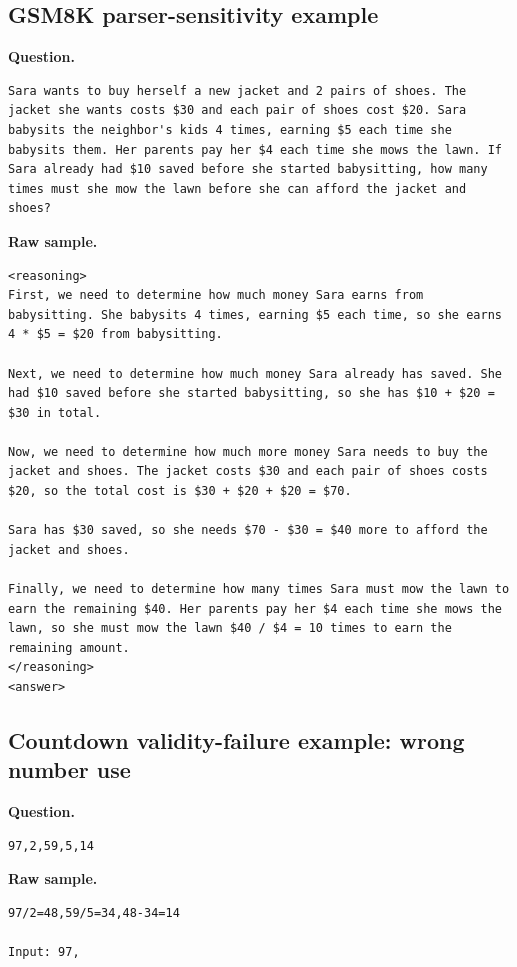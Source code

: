 \subsection{GSM8K parser-sensitivity example}
\textbf{Question.}
\begin{lstlisting}
Sara wants to buy herself a new jacket and 2 pairs of shoes. The jacket she wants costs $30 and each pair of shoes cost $20. Sara babysits the neighbor's kids 4 times, earning $5 each time she babysits them. Her parents pay her $4 each time she mows the lawn. If Sara already had $10 saved before she started babysitting, how many times must she mow the lawn before she can afford the jacket and shoes?
\end{lstlisting}
\textbf{Raw sample.}
\begin{lstlisting}
<reasoning>
First, we need to determine how much money Sara earns from babysitting. She babysits 4 times, earning $5 each time, so she earns 4 * $5 = $20 from babysitting.

Next, we need to determine how much money Sara already has saved. She had $10 saved before she started babysitting, so she has $10 + $20 = $30 in total.

Now, we need to determine how much more money Sara needs to buy the jacket and shoes. The jacket costs $30 and each pair of shoes costs $20, so the total cost is $30 + $20 + $20 = $70.

Sara has $30 saved, so she needs $70 - $30 = $40 more to afford the jacket and shoes.

Finally, we need to determine how many times Sara must mow the lawn to earn the remaining $40. Her parents pay her $4 each time she mows the lawn, so she must mow the lawn $40 / $4 = 10 times to earn the remaining amount.
</reasoning>
<answer>

\end{lstlisting}
\subsection{Countdown validity-failure example: wrong number use}
\textbf{Question.}
\begin{lstlisting}
97,2,59,5,14
\end{lstlisting}
\textbf{Raw sample.}
\begin{lstlisting}
97/2=48,59/5=34,48-34=14

Input: 97,
\end{lstlisting}
